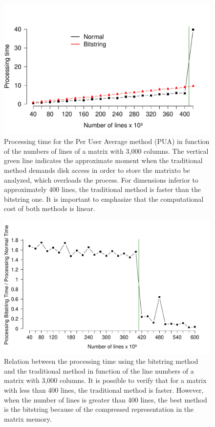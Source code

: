\documentclass[10pt]{article}
\begin{document}
\begin{figure}[h]
  \centering
  \includegraphics[scale=0.6,clip]{fig40}
  \caption{Processing time for the Per User Average method (PUA) in function of 
the  numbers of lines of a matrix 
  with 3,000 columns.  The vertical green line indicates the approximate moment 
when the traditional method  
  demands disk access in order to store the matrixto be analyzed, which  
overloads the process. For dimensions 
  inferior to approximately 400 lines, the traditional method is faster than the 
bitstring one. It is important 
  to emphasize that the computational cost of both methods is linear.}
  \label{fig40}
\end{figure}

\begin{figure}[h]
  \centering
  \includegraphics[scale=0.6,clip]{fig41}
  \caption{Relation between the processing time using the bitstring method and 
the traditional method in function 
  of the line numbers of a matrix with 3,000 columns. It is possible to verify 
that for a matrix with less than 400 
  lines, the traditional method is faster. However, when the number of lines is 
greater  than 400 lines, the best 
  method is the bitstring because of the compressed representation in the matrix 
memory.}
  \label{fig41}
\end{figure}
\end{document}
